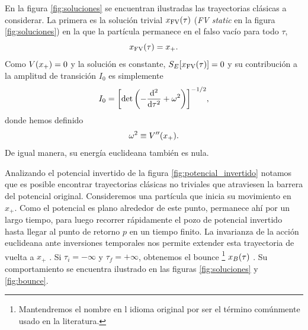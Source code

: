 En la figura \ref{fig:soluciones} se encuentran ilustradas las trayectorias clásicas a considerar. La primera es la solución trivial $x_{\text{FV}}\qty(\tau)$ (\emph{FV static} en la figura \ref{fig:soluciones}) en la que la partícula permanece en el falso vacío para todo $\tau$,
\begin{equation}
x_{\text{FV}}\qty(\tau) = x_+.
\end{equation} 
Como $V\qty(x_+) = 0$ y la solución es constante, $S_E[x_{\text{FV}}\qty(\tau)] = 0$ 
y su contribución a la amplitud de transición $I_0$ es simplemente %
\begin{equation}
	I_0 = \qty[ \det\left(-\dv[2]{\tau} + \omega^2 \right) ]^{-1/2},
\end{equation}
donde hemos definido %
\begin{equation}
	\omega^2 \equiv V''\qty(x_+).
\end{equation}
De igual manera, %
su energía euclideana también es nula. %


Analizando el potencial invertido de la figura \ref{fig:potencial_invertido} notamos que es posible encontrar trayectorias clásicas no triviales que atraviesen la barrera del potencial original. Consideremos una partícula que inicia su movimiento en $x_+$. Como el potencial es plano alrededor de este punto, permanece ahí por un largo tiempo, para luego recorrer rápidamente el pozo de potencial invertido hasta llegar al punto de retorno $p$ en un tiempo finito. %
La invarianza de la acción euclideana ante inversiones temporales  nos permite extender esta trayectoria de vuelta a $x_+$ \cite{weinberg2012classical}. Si $\tau_i = -\infty$ y $\tau_f = +\infty$,
obtenemos el bounce \footnote{Mantendremos el nombre en l idioma original por ser el término comúnmente usado en la literatura.}  $x_B\qty(\tau)$ \cite{coleman1977fate}. Su comportamiento se encuentra ilustrado en las figuras \ref{fig:soluciones} y \ref{fig:bounce}. 

